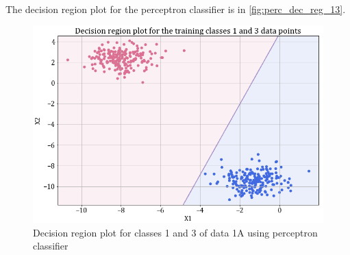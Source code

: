 \documentclass[11pt,a4paper]{article}
\newcommand{\noi}{\noindent}
\begin{document}
\noi
The decision region plot for the perceptron classifier is in \autoref{fig:perc_dec_reg_13}.
\begin{figure}[H]
    \centering
    \includegraphics[scale = 0.45]{images/1A_perceptron_training_classes_1_and_3_dec_reg.png}
    \caption{Decision region plot for classes 1 and 3 of data 1A using perceptron classifier}
    \label{fig:perc_dec_reg_13}
\end{figure}


\end{document}
